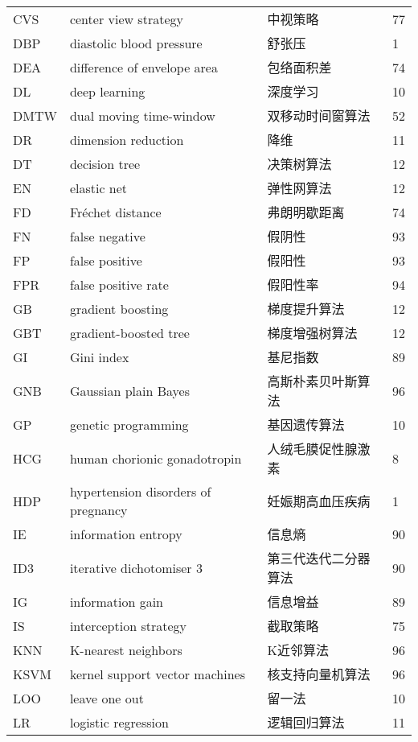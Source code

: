 \begin{center}
\begin{longtable}{m{2cm}m{7cm}m{5cm}m{1cm}<{\centering}}
        CVS & center view strategy & 中视策略 & 77 \\
        DBP     &       diastolic blood pressure                         &   舒张压                 &    1   \\
        DEA & difference of envelope area  & 包络面积差& 74 \\
        DL & deep learning & 深度学习 & 10 \\
        DMTW & dual moving time-window & 双移动时间窗算法& 52 \\
        DR  & dimension reduction & 降维 & 11 \\
        DT & decision tree & 决策树算法 & 12\\
        EN & elastic net  & 弹性网算法 & 12 \\
        FD & Fréchet distance & 弗朗明歇距离 & 74 \\
        FN & false negative & 假阴性 & 93 \\
        FP & false positive & 假阳性 & 93 \\
        FPR & false positive rate& 假阳性率 & 94 \\
        GB &  gradient boosting  & 梯度提升算法 & 12 \\
        GBT& gradient-boosted tree & 梯度增强树算法& 12\\
        GI & Gini index & 基尼指数 & 89 \\
        GNB & Gaussian plain Bayes & 高斯朴素贝叶斯算法 & 96 \\
        GP  & genetic programming   & 基因遗传算法  &10 \\
        HCG     & human chorionic gonadotropin  & 人绒毛膜促性腺激素    & 8 \\
        HDP     &       hypertension disorders of pregnancy             &   妊娠期高血压疾病        &   1    \\
        IE & information entropy & 信息熵 & 90 \\
        ID3 & iterative dichotomiser 3 & 第三代迭代二分器算法 & 90 \\
        IG & information gain & 信息增益 & 89 \\
        IS & interception strategy & 截取策略 & 75 \\
        KNN & K-nearest neighbors & K近邻算法 & 96 \\
        KSVM & kernel support vector machines & 核支持向量机算法 & 96 \\
        LOO & leave one out & 留一法 & 10 \\
        LR  & logistic regression  & 逻辑回归算法 & 11 \\

\end{longtable}
\end{center}

